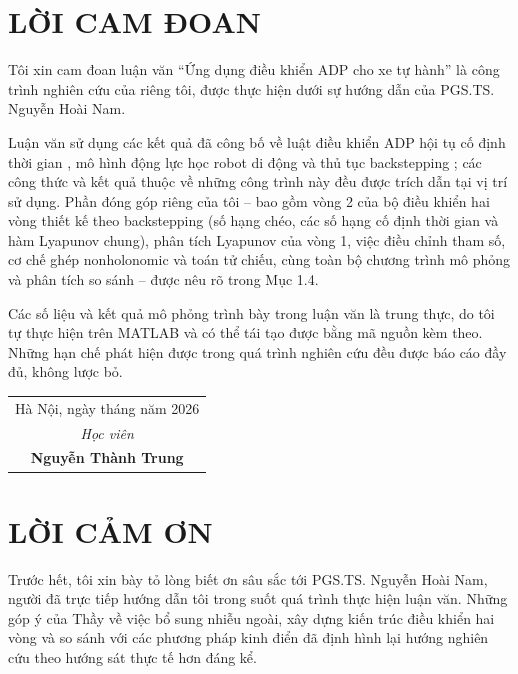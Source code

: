 \documentclass[12pt,a4paper]{article}
\begin{document}
\newpage
{}

\section*{LỜI CAM ĐOAN}

Tôi xin cam đoan luận văn ``Ứng dụng điều khiển ADP cho xe tự hành'' là công trình nghiên cứu của riêng tôi, được thực hiện dưới sự hướng dẫn của PGS.TS. Nguyễn Hoài Nam.

Luận văn sử dụng các kết quả đã công bố về luật điều khiển ADP hội tụ cố định thời gian \cite{Wang2025}, mô hình động lực học robot di động \cite{Fierro1997} và thủ tục backstepping \cite{Krstic1995}; các công thức và kết quả thuộc về những công trình này đều được trích dẫn tại vị trí sử dụng. Phần đóng góp riêng của tôi -- bao gồm vòng 2 của bộ điều khiển hai vòng thiết kế theo backstepping (số hạng chéo, các số hạng cố định thời gian và hàm Lyapunov chung), phân tích Lyapunov của vòng 1, việc điều chỉnh tham số, cơ chế ghép nonholonomic và toán tử chiếu, cùng toàn bộ chương trình mô phỏng và phân tích so sánh -- được nêu rõ trong Mục 1.4.

Các số liệu và kết quả mô phỏng trình bày trong luận văn là trung thực, do tôi tự thực hiện trên MATLAB và có thể tái tạo được bằng mã nguồn kèm theo. Những hạn chế phát hiện được trong quá trình nghiên cứu đều được báo cáo đầy đủ, không lược bỏ.

\vspace{1.2cm}
\begin{flushright}
\begin{tabular}{c}
Hà Nội, ngày \quad tháng \quad năm 2026 \\[0.3cm]
\textit{Học viên} \\[2.0cm]
\textbf{Nguyễn Thành Trung}
\end{tabular}
\end{flushright}

\newpage
\section*{LỜI CẢM ƠN}

Trước hết, tôi xin bày tỏ lòng biết ơn sâu sắc tới PGS.TS. Nguyễn Hoài Nam, người đã trực tiếp hướng dẫn tôi trong suốt quá trình thực hiện luận văn. Những góp ý của Thầy về việc bổ sung nhiễu ngoài, xây dựng kiến trúc điều khiển hai vòng và so sánh với các phương pháp kinh điển đã định hình lại hướng nghiên cứu theo hướng sát thực tế hơn đáng kể.
\end{document}
